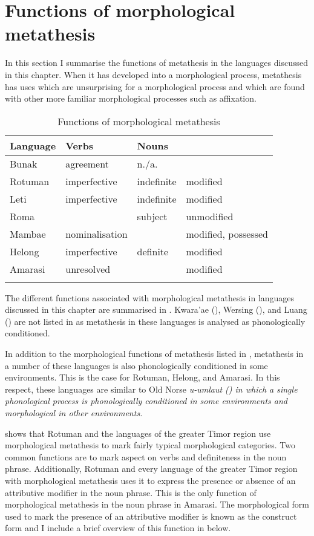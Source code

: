 \section{Functions of morphological metathesis}\label{sec:FunMorMet}
In this section I summarise the functions of metathesis
in the languages discussed in this chapter.
When it has developed into a morphological process,
metathesis has uses which are unsurprising for
a morphological process and which are found with other
more familiar morphological processes such as affixation.

\begin{table}[h]
	\caption{Functions of morphological metathesis}\label{tab:FunMorMet}
		\centering
			\begin{tabular}{llll}\lsptoprule
				Language	&Verbs					&Nouns 			& 					\\ \midrule
				Bunak			&agreement			&n./a.			&					 	\\
				Rotuman		&imperfective		&indefinite	&modified 	\\
				Leti			&imperfective		&indefinite	&modified 	\\
				Roma			&								&subject		&unmodified \\
				Mambae		&nominalisation	&						&modified, possessed\\
				Helong		&imperfective		&definite		&modified 	\\
				Amarasi		&unresolved			&						&modified 	\\\lspbottomrule
			\end{tabular}
\end{table}

The different functions associated with morphological metathesis
in languages discussed in this chapter are summarised in .
Kwara'ae (), Wersing (), and Luang ()
are not listed in 
as metathesis in these languages is analysed as phonologically conditioned.

In addition to the morphological functions of metathesis
listed in , metathesis in a number
of these languages is also phonologically conditioned in some environments.
This is the case for Rotuman, Helong, and Amarasi.
In this respect, these languages are similar to Old Norse \it{u}-umlaut ()
in which a single phonological process is phonologically conditioned in
some environments and morphological in other environments.

 shows that Rotuman
and the languages of the greater Timor region
use morphological metathesis to mark
fairly typical morphological categories.
Two common functions are to mark aspect on verbs
and definiteness in the noun phrase.
Additionally, Rotuman and every language of the greater Timor region
with morphological metathesis uses
it to express the presence or absence of an attributive modifier in the noun phrase.
This is the only function of morphological metathesis in the noun phrase in Amarasi.
The morphological form used to mark the presence of an attributive modifier
is known as the construct form and I include a brief overview
of this function in  below.

